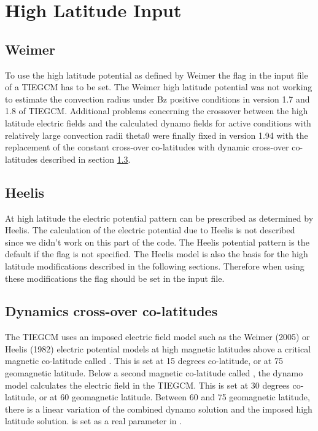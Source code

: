 \section{High Latitude Input}\label{cap:high_lat}
%
\subsection{Weimer}
%
To use the high latitude potential as defined by
Weimer the flag  in the input file of a TIEGCM 
has to be set. The Weimer high latitude potential was not working to estimate 
the convection radius under Bz positive conditions in version 1.7 and 1.8 of TIEGCM.  
Additional problems concerning the crossover between the high latitude electric 
fields and the calculated dynamo fields for active conditions with relatively large 
convection radii theta0 were finally fixed in version 1.94 with the replacement of 
the constant cross-over co-latitudes with dynamic cross-over co-latitudes described 
in section \ref{cap:dynamic_cross_over_colat}.
%
\subsection{Heelis}
%
At high latitude the electric potential pattern can be prescribed as
determined by Heelis. The calculation of the
electric potential due to Heelis is not described since we didn't work
on this part of the code. The Heelis potential pattern is the
default if the flag  is not specified. 
The Heelis model is also the
basis for the high latitude modifications described in the following
sections. Therefore when using these modifications the flag  
 should be set in the input file.
%
\subsection{Dynamics cross-over co-latitudes} \label{cap:dynamic_cross_over_colat}
%
The TIEGCM uses an imposed electric field model such as the Weimer (2005) \cite{Weimer2005} or 
Heelis (1982) \cite{heelis1982} electric potential models at high magnetic latitudes above a 
critical magnetic co-latitude called .  This is set at 15 degrees 
co-latitude, or at 75 geomagnetic latitude.  Below a second magnetic co-latitude called
, 
the dynamo model calculates the electric field in the TIEGCM.  This is set at 30 
degrees co-latitude, or at 60 geomagnetic latitude.  Between 60 and 75 geomagnetic
latitude, there is a linear 
variation of the combined dynamo solution and the imposed high latitude solution.   
 is set as a real parameter in  . \\

